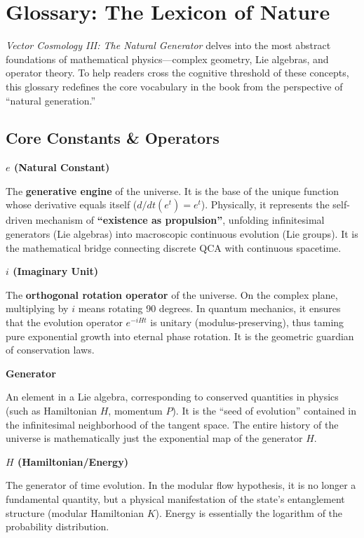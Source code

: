 \documentclass[11pt,a4paper,twoside]{book}
\begin{document}
\clearpage{}

\backmatter

\clearpage{}\chapter*{Glossary: The Lexicon of Nature}

\textit{Vector Cosmology III: The Natural Generator} delves into the most abstract foundations of mathematical physics---complex geometry, Lie algebras, and operator theory. To help readers cross the cognitive threshold of these concepts, this glossary redefines the core vocabulary in the book from the perspective of ``natural generation.''

\section{Core Constants \& Operators}

\textbf{$e$ (Natural Constant)}

The \textbf{generative engine} of the universe. It is the base of the unique function whose derivative equals itself ($d/dt(e^t)=e^t$). Physically, it represents the self-driven mechanism of \textbf{``existence as propulsion''}, unfolding infinitesimal generators (Lie algebras) into macroscopic continuous evolution (Lie groups). It is the mathematical bridge connecting discrete QCA with continuous spacetime.

\textbf{$i$ (Imaginary Unit)}

The \textbf{orthogonal rotation operator} of the universe. On the complex plane, multiplying by $i$ means rotating 90 degrees. In quantum mechanics, it ensures that the evolution operator $e^{-iHt}$ is unitary (modulus-preserving), thus taming pure exponential growth into eternal phase rotation. It is the geometric guardian of conservation laws.

\textbf{Generator}

An element in a Lie algebra, corresponding to conserved quantities in physics (such as Hamiltonian $H$, momentum $P$). It is the ``seed of evolution'' contained in the infinitesimal neighborhood of the tangent space. The entire history of the universe is mathematically just the exponential map of the generator $H$.

\textbf{$H$ (Hamiltonian/Energy)}

The generator of time evolution. In the modular flow hypothesis, it is no longer a fundamental quantity, but a physical manifestation of the state's entanglement structure (modular Hamiltonian $K$). Energy is essentially the logarithm of the probability distribution.
\end{document}
